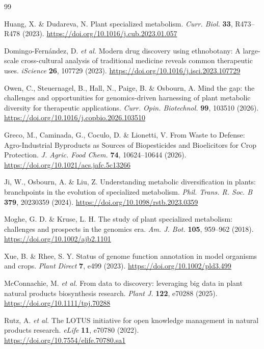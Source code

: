 \documentclass[11pt,a4paper]{article}
\begin{document}
\begin{thebibliography}{99}
\setlength{\itemsep}{0pt}

Huang, X. \& Dudareva, N. Plant specialized metabolism. \textit{Curr. Biol.} \textbf{33}, R473--R478 (2023). \url{https://doi.org/10.1016/j.cub.2023.01.057}

Domingo-Fern\'andez, D. \textit{et al.} Modern drug discovery using ethnobotany: A large-scale cross-cultural analysis of traditional medicine reveals common therapeutic uses. \textit{iScience} \textbf{26}, 107729 (2023). \url{https://doi.org/10.1016/j.isci.2023.107729}

Owen, C., Steuernagel, B., Hall, N., Paige, B. \& Osbourn, A. Mind the gap: the challenges and opportunities for genomics-driven harnessing of plant metabolic diversity for therapeutic applications. \textit{Curr. Opin. Biotechnol.} \textbf{99}, 103510 (2026). \url{https://doi.org/10.1016/j.copbio.2026.103510}

Greco, M., Caminada, G., Coculo, D. \& Lionetti, V. From Waste to Defense: Agro-Industrial Byproducts as Sources of Biopesticides and Bioelicitors for Crop Protection. \textit{J. Agric. Food Chem.} \textbf{74}, 10624--10644 (2026). \url{https://doi.org/10.1021/acs.jafc.5c13266}

Ji, W., Osbourn, A. \& Liu, Z. Understanding metabolic diversification in plants: branchpoints in the evolution of specialized metabolism. \textit{Phil. Trans. R. Soc. B} \textbf{379}, 20230359 (2024). \url{https://doi.org/10.1098/rstb.2023.0359}

Moghe, G. D. \& Kruse, L. H. The study of plant specialized metabolism: challenges and prospects in the genomics era. \textit{Am. J. Bot.} \textbf{105}, 959--962 (2018). \url{https://doi.org/10.1002/ajb2.1101}

Xue, B. \& Rhee, S. Y. Status of genome function annotation in model organisms and crops. \textit{Plant Direct} \textbf{7}, e499 (2023). \url{https://doi.org/10.1002/pld3.499}

McConnachie, M. \textit{et al.} From data to discovery: leveraging big data in plant natural products biosynthesis research. \textit{Plant J.} \textbf{122}, e70288 (2025). \url{https://doi.org/10.1111/tpj.70288}

Rutz, A. \textit{et al.} The LOTUS initiative for open knowledge management in natural products research. \textit{eLife} \textbf{11}, e70780 (2022). \url{https://doi.org/10.7554/elife.70780.sa1}


\end{thebibliography}
\end{document}
